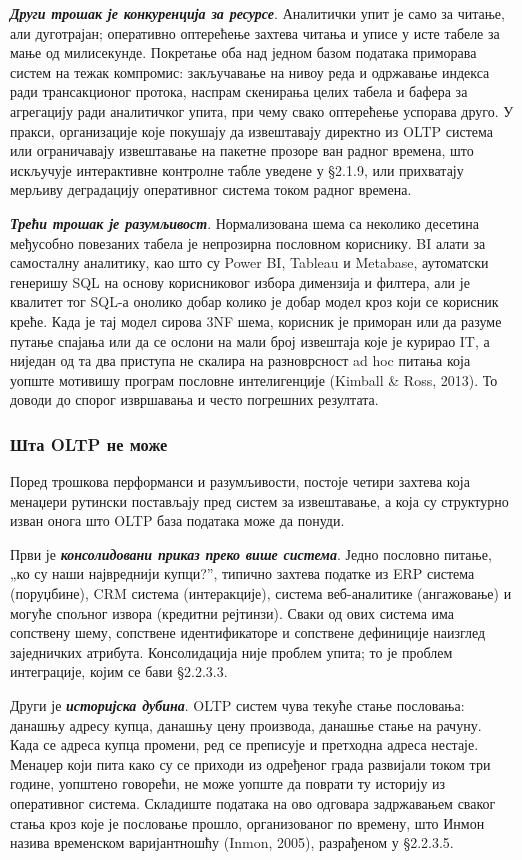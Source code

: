 \textbf{\textit{Други трошак је конкуренција за ресурсе}}. Аналитички упит је само за читање, али дуготрајан; оперативно оптерећење захтева читања и уписе у исте табеле за мање од милисекунде. Покретање оба над једном базом података приморава систем на тежак компромис: закључавање на нивоу реда и одржавање индекса ради трансакционог протока, наспрам скенирања целих табела и бафера за агрегацију ради аналитичког упита, при чему свако оптерећење успорава друго. У пракси, организације које покушају да извештавају директно из OLTP система или ограничавају извештавање на пакетне прозоре ван радног времена, што искључује интерактивне контролне табле уведене у §2.1.9, или прихватају мерљиву деградацију оперативног система током радног времена.

\textbf{\textit{Трећи трошак је разумљивост}}. Нормализована шема са неколико десетина међусобно повезаних табела је непрозирна пословном кориснику. BI алати за самосталну аналитику, као што су Power BI, Tableau и Metabase, аутоматски генеришу SQL на основу корисниковог избора димензија и филтера, али је квалитет тог SQL-а онолико добар колико је добар модел кроз који се корисник креће. Када је тај модел сирова 3NF шема, корисник је приморан или да разуме путање спајања или да се ослони на мали број извештаја које је курирао IT, а ниједан од та два приступа не скалира на разноврсност ad hoc питања која уопште мотивишу програм пословне интелигенције (Kimball \& Ross, 2013). То доводи до спорог извршавања и често погрешних резултата.

\subsubsection{Шта OLTP не може}
Поред трошкова перформанси и разумљивости, постоје четири захтева која менаџери рутински постављају пред систем за извештавање, а која су структурно изван онога што OLTP база података може да понуди.

Први је \textbf{\textit{консолидовани приказ преко више система}}. Једно пословно питање, „ко су наши највреднији купци?”, типично захтева податке из ERP система (поруџбине), CRM система (интеракције), система веб-аналитике (ангажовање) и могуће спољног извора (кредитни рејтинзи). Сваки од ових система има сопствену шему, сопствене идентификаторе и сопствене дефиниције наизглед заједничких атрибута. Консолидација није проблем упита; то је проблем интеграције, којим се бави §2.2.3.3.

Други је \textbf{\textit{историјска дубина}}. OLTP систем чува текуће стање пословања: данашњу адресу купца, данашњу цену производа, данашње стање на рачуну. Када се адреса купца промени, ред се преписује и претходна адреса нестаје. Менаџер који пита како су се приходи из одређеног града развијали током три године, уопштено говорећи, не може уопште да поврати ту историју из оперативног система. Складиште података на ово одговара задржавањем сваког стања кроз које је пословање прошло, организованог по времену, што Инмон назива временском варијантношћу (Inmon, 2005), разрађеном у §2.2.3.5.

